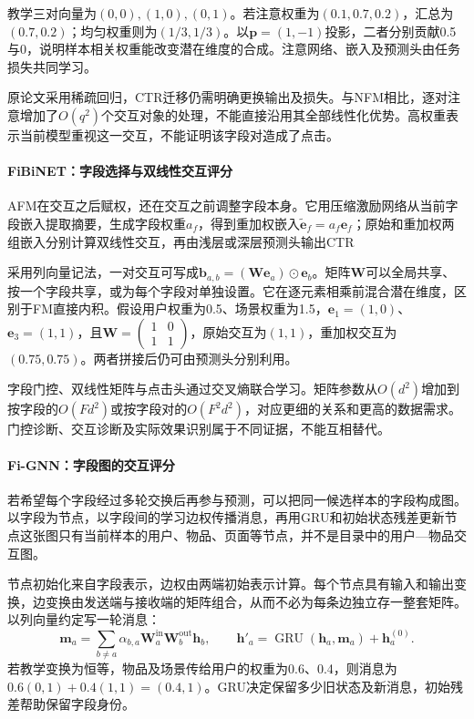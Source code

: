 教学三对向量为$(0,0),(1,0),(0,1)$。若注意权重为$(0.1,0.7,0.2)$，汇总为$(0.7,0.2)$；均匀权重则为$(1/3,1/3)$。以$\bm p=(1,-1)$投影，二者分别贡献0.5与0，说明样本相关权重能改变潜在维度的合成。注意网络、嵌入及预测头由任务损失共同学习。

原论文采用稀疏回归，CTR迁移仍需明确更换输出及损失。与NFM相比，逐对注意增加了$O(q^2)$个交互对象的处理，不能直接沿用其全部线性化优势。高权重表示当前模型重视这一交互，不能证明该字段对造成了点击。

\paragraph{FiBiNET：字段选择与双线性交互评分}
\label{sec:rs-fibinet}

AFM在交互之后赋权，还在交互之前调整字段本身。它用压缩激励网络从当前字段嵌入提取摘要，生成字段权重$a_f$，得到重加权嵌入$\widetilde{\bm e}_f=a_f\bm e_f$；原始和重加权两组嵌入分别计算双线性交互，再由浅层或深层预测头输出CTR

采用列向量记法，一对交互可写成$\bm b_{a,b}=(\bm W\bm e_a)\odot\bm e_b$。矩阵$\bm W$可以全局共享、按一个字段共享，或为每个字段对单独设置。它在逐元素相乘前混合潜在维度，区别于FM直接内积。假设用户权重为0.5、场景权重为1.5，$\bm e_1=(1,0)$、$\bm e_3=(1,1)$，且$\bm W=\left(\begin{smallmatrix}1&0\\1&1\end{smallmatrix}\right)$，原始交互为$(1,1)$，重加权交互为$(0.75,0.75)$。两者拼接后仍可由预测头分别利用。

字段门控、双线性矩阵与点击头通过交叉熵联合学习。矩阵参数从$O(d^2)$增加到按字段的$O(Fd^2)$或按字段对的$O(F^2d^2)$，对应更细的关系和更高的数据需求。门控诊断、交互诊断及实际效果识别属于不同证据，不能互相替代。

\paragraph{Fi-GNN：字段图的交互评分}
\label{sec:rs-fi-gnn}

若希望每个字段经过多轮交换后再参与预测，可以把同一候选样本的字段构成图。以字段为节点，以字段间的学习边权传播消息，再用GRU和初始状态残差更新节点这张图只有当前样本的用户、物品、页面等节点，并不是目录中的用户—物品交互图。

节点初始化来自字段表示，边权由两端初始表示计算。每个节点具有输入和输出变换，边变换由发送端与接收端的矩阵组合，从而不必为每条边独立存一整套矩阵。以列向量约定写一轮消息：
\[
 \bm m_a=\sum_{b\ne a}\alpha_{b,a}
       \bm W^{\mathrm{in}}_a\bm W^{\mathrm{out}}_b\bm h_b,\qquad
 \bm h'_a=\operatorname{GRU}(\bm h_a,\bm m_a)+\bm h_a^{(0)}.
\]
若教学变换为恒等，物品及场景传给用户的权重为0.6、0.4，则消息为$0.6(0,1)+0.4(1,1)=(0.4,1)$。GRU决定保留多少旧状态及新消息，初始残差帮助保留字段身份。


